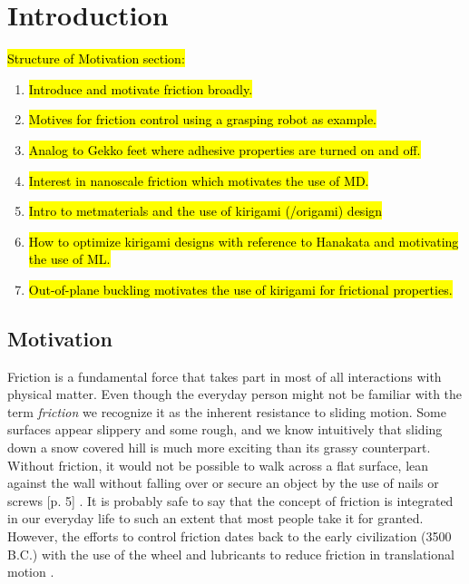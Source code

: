 \chapter{Introduction}

\hl{Structure of Motivation section:}
\begin{enumerate}
    \item \hl{Introduce and motivate friction broadly.}
    \item \hl{Motives for friction control using a grasping robot as example.}
    \item \hl{Analog to Gekko feet where adhesive properties are turned on and off.}
    \item \hl{Interest in nanoscale friction which motivates the use of MD.}
    \item \hl{Intro to metmaterials and the use of kirigami (/origami) design}
    \item \hl{How to optimize kirigami designs with reference to Hanakata and motivating the use of ML.}
    \item \hl{Out-of-plane buckling motivates the use of kirigami for frictional properties.}
\end{enumerate}

\section{Motivation}
Friction is a fundamental force that takes part in most of all interactions with
physical matter. Even though the everyday person might not be familiar with the
term \textit{friction} we recognize it as the inherent resistance to sliding
motion. Some surfaces appear slippery and some rough, and we know intuitively
that sliding down a snow covered hill is much more exciting than its grassy
counterpart. Without friction, it would not be possible to walk across a flat
surface, lean against the wall without falling over or secure an object by the use
of nails or screws [p. 5] \cite{gnecco_meyer_2015}. It is probably safe to say that the concept of friction is integrated in our everyday life to such an extent that
most people take it for granted. However, the efforts to control friction dates
back to the early civilization (3500 B.C.) with the use of the wheel and
lubricants to reduce friction in translational motion \cite{bhushan_2013}. 

